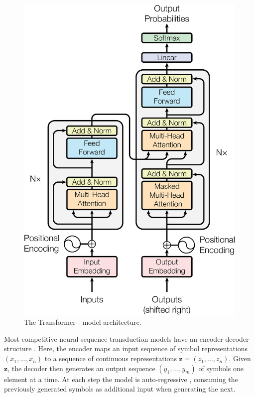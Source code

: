 \documentclass{article}
\begin{document}
\begin{figure}
  \centering
  \includegraphics[scale=0.6]{Figures/ModalNet-21}
  \caption{The Transformer - model architecture.}
  \label{fig:model-arch}
\end{figure}



Most competitive neural sequence transduction models have an encoder-decoder structure \citep{cho2014learning,bahdanau2014neural,sutskever14}. Here, the encoder maps an input sequence of symbol representations $(x_1, ..., x_n)$ to a sequence of continuous representations $\mathbf{z} = (z_1, ..., z_n)$. Given $\mathbf{z}$, the decoder then generates an output sequence $(y_1,...,y_m)$ of symbols one element at a time. At each step the model is auto-regressive \citep{graves2013generating}, consuming the previously generated symbols as additional input when generating the next.
\end{document}

